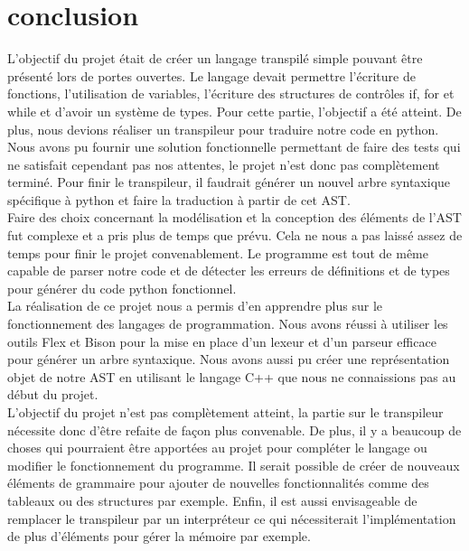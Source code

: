 \documentclass[a4paper]{article}%
\begin{document}
\clearpage
\section*{conclusion}
\large

L'objectif du projet était de créer un langage transpilé simple pouvant être
présenté lors de portes ouvertes. Le langage devait permettre l'écriture de
fonctions, l'utilisation de variables, l'écriture des structures de contrôles
if, for et while et d'avoir un système de types. Pour cette partie, l'objectif a
été atteint. De plus, nous devions réaliser un transpileur pour traduire notre
code en python. Nous avons pu fournir une solution fonctionnelle permettant de
faire des tests qui ne satisfait cependant pas nos attentes, le projet n'est
donc pas complètement terminé. Pour finir le transpileur, il faudrait générer un
nouvel arbre syntaxique spécifique à python et faire la traduction à partir de
cet AST.\\

Faire des choix concernant la modélisation et la conception des éléments de
l'AST fut complexe et a pris plus de temps que prévu. Cela ne nous a pas laissé
assez de temps pour finir le projet convenablement. Le programme est tout de
même capable de parser notre code et de détecter les erreurs de définitions et
de types pour générer du code python fonctionnel.\\

La réalisation de ce projet nous a permis d'en apprendre plus sur le
fonctionnement des langages de programmation. Nous avons réussi à utiliser les
outils Flex et Bison pour la mise en place d'un lexeur et d'un parseur efficace
pour générer un arbre syntaxique. Nous avons aussi pu créer une représentation
objet de notre AST en utilisant le langage C++ que nous ne connaissions pas au
début du projet.\\

L'objectif du projet n'est pas complètement atteint, la partie sur le
transpileur nécessite donc d'être refaite de façon plus convenable. De plus, il
y a beaucoup de choses qui pourraient être apportées au projet pour compléter le
langage ou modifier le fonctionnement du programme. Il serait possible de créer
de nouveaux éléments de grammaire pour ajouter de nouvelles fonctionnalités
comme des tableaux ou des structures par exemple. Enfin, il est aussi
envisageable de remplacer le transpileur par un interpréteur ce qui
nécessiterait l'implémentation de plus d'éléments pour gérer la mémoire par
exemple.
\end{document}
